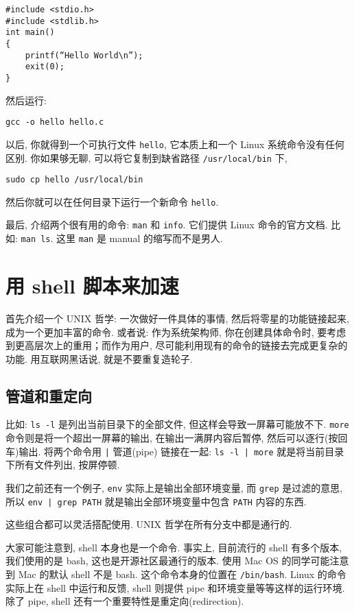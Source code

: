 \documentclass[a4paper]{ctexart}
\begin{document}
\begin{verbatim}
#include <stdio.h>
#include <stdlib.h>
int main()
{
    printf(“Hello World\n”);
    exit(0);
}
\end{verbatim}

然后运行:

\begin{verbatim}
gcc -o hello hello.c
\end{verbatim}

以后, 你就得到一个可执行文件 \verb|hello|, 它本质上和一个 Linux 系统命令没有任何区别. 
你如果够无聊, 可以将它复制到缺省路径 \verb|/usr/local/bin| 下,  

\begin{verbatim}
sudo cp hello /usr/local/bin
\end{verbatim}

然后你就可以在任何目录下运行一个新命令 \verb|hello|. 

最后, 介绍两个很有用的命令: \verb|man| 和 \verb|info|. 它们提供 Linux 命令的官方文档. 比如:
\verb|man ls|. 这里 \verb|man| 是 manual 的缩写而不是男人.

\section{用 shell 脚本来加速}

首先介绍一个 UNIX 哲学: 一次做好一件具体的事情, 然后将零星的功能链接起来, 成为一个更加丰富的命令.
或者说: 作为系统架构师, 你在创建具体命令时, 要考虑到更高层次上的重用；而作为用户,
尽可能利用现有的命令的链接去完成更复杂的功能. 用互联网黑话说, 就是不要重复造轮子.

\subsection{管道和重定向}
比如: \verb|ls -l| 是列出当前目录下的全部文件, 但这样会导致一屏幕可能放不下.
\verb|more| 命令则是将一个超出一屏幕的输出, 在输出一满屏内容后暂停, 然后可以逐行(按回车)输出.
将两个命令用 \verb!|! 管道(pipe) 链接在一起: \verb!ls -l | more! 就是将当前目录下所有文件列出,
按屏停顿.

我们之前还有一个例子, \verb|env| 实际上是输出全部环境变量, 而 \verb|grep| 是过滤的意思,
所以 \verb!env | grep PATH! 就是输出全部环境变量中包含 \verb|PATH| 内容的东西.

这些组合都可以灵活搭配使用. UNIX 哲学在所有分支中都是通行的. 

大家可能注意到, shell 本身也是一个命令. 事实上, 目前流行的 shell 有多个版本, 我们使用的是 bash,
这也是开源社区最通行的版本. 使用 Mac OS 的同学可能注意到 Mac 的默认 shell 不是 bash.
这个命令本身的位置在 \verb|/bin/bash|. Linux 的命令实际上在 shell 中运行和反馈, shell 则提供 pipe
和环境变量等等这样的运行环境. 除了 pipe, shell 还有一个重要特性是重定向(redirection).
\end{document}
